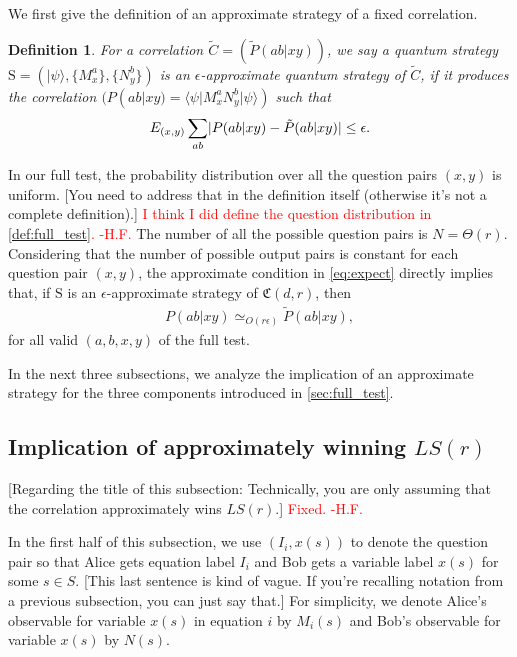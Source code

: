 \documentclass[11pt,letterpaper]{article}
\newcommand{\ket}[1]{|#1\rangle}
\newcommand{\bra}[1]{\langle#1|}
\DeclarePairedDelimiter{\abs}{\lvert}{\rvert}
\newcommand{\1}{\mathbb{1}}
\newcommand{\LS}{LS}
\newcommand{\fC}{\mathfrak{C}}
\newcommand{\bS}{\mathrm{S}}
\newcommand{\pr}[2]{P(#1|#2)}
\newcommand{\tpr}[2]{\tilde{P}(#1|#2)}
\newcommand{\ep}{\epsilon}
\newcommand{\appd}[1]{\simeq_{#1}}
\def\carl#1{{\color{blue} #1}}
\newcommand{\hfc}[1]{\textcolor{red}{#1 -H.F.}}
\newtheorem{definition}[theorem]{Definition}
\theoremstyle{definition}
\begin{document}
We first give the definition of an approximate strategy of a fixed correlation.
\begin{definition}
	For a correlation $\tilde{C} = (\tpr{ab}{xy})$,
	we say a quantum strategy $\bS = (\ket{\psi}, \{M_x^a\}, \{N_y^b\})$
	is an $\ep$-approximate quantum strategy of $\tilde{C}$, 
	if it produces the correlation
	$( \pr{ab}{xy} = \bra{\psi} M_x^a N_y^b \ket{\psi} )$ such that
	\begin{align}
	\label{eq:expect}
	E_{(x,y)} \sum_{ab} \abs{\pr{ab}{xy} - \tpr{ab}{xy}} \leq \ep.
	\end{align}
\end{definition}
In our full test, the probability distribution over all the question pairs $(x,y)$ is uniform.  \carl{[You need to address that in the definition itself (otherwise it's not a complete definition).]}
\hfc{I think I did define the question distribution in \cref{def:full_test}. }
The number of all the possible question pairs is 
$N = \Theta(r)$.
Considering that
the number of possible output pairs is constant for each question pair $(x,y)$, 
the approximate condition in \cref{eq:expect} directly implies that, if $\bS$ is an $\ep$-approximate strategy
of $\fC(d,r)$, then
\begin{align*}
    \pr{ab}{xy} \appd{O(r\ep)} \tpr{ab}{xy},
\end{align*}
for all valid $(a,b,x,y)$ of the full test.

In the next three subsections, we analyze the implication of an approximate strategy for the 
three components introduced in \cref{sec:full_test}.

\subsection{Implication of approximately winning $\LS(r)$}
\label{sec:imp_lct}
\carl{[Regarding the title of this subsection: Technically, you are only assuming that the correlation approximately wins $LS ( r )$.]}
\hfc{Fixed.}

In the first half of this subsection, we use $(I_i,x(s))$ to denote the question pair so that Alice gets equation label $I_i$ and Bob gets a variable label $x(s)$ for some $s \in S$. 
\carl{[This last sentence is kind of vague.  If you're recalling notation from a previous subsection, you can just say that.]}
For simplicity, we denote 
Alice's observable for variable $x(s)$ in equation $i$ by $M_i(s)$ and
Bob's observable for variable $x(s)$ by $N(s)$. 
\end{document}
